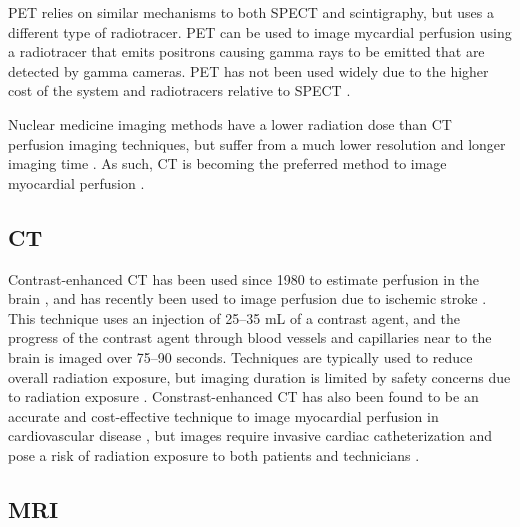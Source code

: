 PET relies on similar mechanisms to both SPECT and scintigraphy, but uses a different type 
of radiotracer. PET can be used to image mycardial perfusion using a radiotracer that 
emits positrons 
causing gamma rays to be emitted that are detected by gamma cameras. PET has 
not been used widely due to the higher cost of the system and radiotracers relative to 
SPECT \parencite{driessen_myocardial_2017}.

Nuclear medicine imaging methods have a lower radiation dose than CT perfusion imaging techniques,
but suffer from a much lower resolution and longer imaging time \parencite{aljizeeri_ct_2013}. 
As such, CT is becoming the preferred 
method to image myocardial perfusion \parencite{aljizeeri_ct_2013}. 

\subsection{CT}

Contrast-enhanced CT has been used since 1980 to estimate perfusion in the brain 
\parencite{axel_cerebral_1980}, 
and has recently been used to image perfusion due to ischemic stroke 
\parencite{miles_colour_1991,koenig_perfusion_1998}.
This technique uses an injection of 25--35 mL 
of a contrast agent, and the progress of the contrast agent through blood vessels 
and capillaries near to the brain is imaged over  75--90 seconds. Techniques are typically used to reduce overall 
radiation exposure, but imaging duration is limited by safety concerns due to radiation exposure
\parencite{konstas_theoretic_2009}.
Constrast-enhanced CT has also been found to be an accurate and cost-effective 
technique to image myocardial perfusion in cardiovascular disease
\parencite{aljizeeri_ct_2013}, but images require invasive cardiac catheterization and 
pose a risk of radiation exposure to 
both patients and technicians \parencite{vijayalakshmi_cardiac_2007}.

\subsection{MRI}


